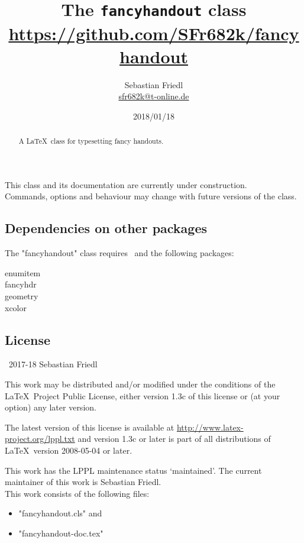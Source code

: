 \documentclass[11pt]{ltxdoc}
\title{The \texttt{fancyhandout} class \\ {\large\url{https://github.com/SFr682k/fancyhandout}}}
\author{Sebastian Friedl \\ \href{mailto:sfr682k@t-online.de}{\ttfamily sfr682k@t-online.de}}
\date{2018/01/18}
\begin{document}
	\maketitle
	
	\begin{abstract}
		\noindent%
		A \LaTeX\ class for typesetting fancy handouts.
	\end{abstract}
	
	This class and its documentation are currently under construction. \\
	Commands, options and behaviour may change with future versions of the class.
	
	\tableofcontents
	\clearpage
	
	
	
	\subsection*{Dependencies on other packages}
	The "fancyhandout" class requires \LaTeXe\ and the following packages:
	\begin{multicols}{3}\ttfamily\centering
		enumitem \\ fancyhdr \\ geometry \\ xcolor
	\end{multicols}
	
	\subsection*{License}
	\textcopyright\ 2017-18 Sebastian Friedl
	
	\smallskip
	This work may be distributed and/or modified under the conditions of the \LaTeX\ Project Public License, either version 1.3c of this license or (at your option) any later version.
	
	\smallskip
	The latest version of this license is available at \url{http://www.latex-project.org/lppl.txt} and version 1.3c or later is part of all distributions of \LaTeX\ version 2008-05-04 or later.
	
	\smallskip
	This work has the LPPL maintenance status \enquote*{maintained}. The current maintainer of this work is Sebastian Friedl. \\
	This work consists of the following files:
	\begin{itemize} \itemsep 0pt
		\item "fancyhandout.cls" and
		\item "fancyhandout-doc.tex"
	\end{itemize}
\end{document}
